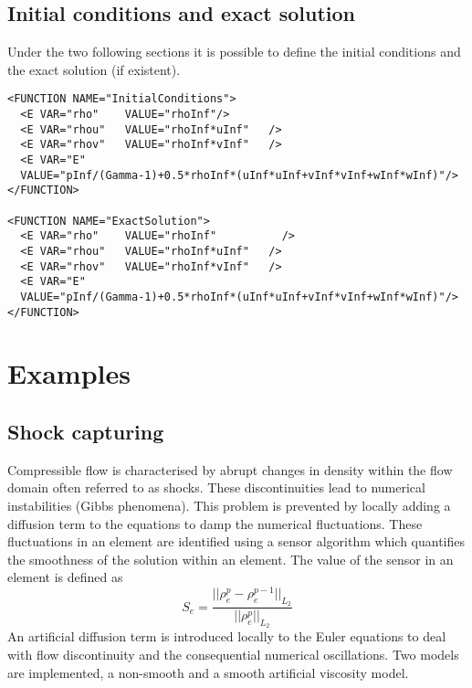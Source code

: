 \subsection*{Initial conditions and exact solution}
Under the two following sections it is possible to define the initial conditions and the exact solution (if existent).
\begin{lstlisting}[style=XmlStyle]
<FUNCTION NAME="InitialConditions">
  <E VAR="rho"    VALUE="rhoInf"/>
  <E VAR="rhou"   VALUE="rhoInf*uInf"   />
  <E VAR="rhov"   VALUE="rhoInf*vInf"   />
  <E VAR="E"
  VALUE="pInf/(Gamma-1)+0.5*rhoInf*(uInf*uInf+vInf*vInf+wInf*wInf)"/>
</FUNCTION>

<FUNCTION NAME="ExactSolution">
  <E VAR="rho"    VALUE="rhoInf"          />
  <E VAR="rhou"   VALUE="rhoInf*uInf"   />
  <E VAR="rhov"   VALUE="rhoInf*vInf"   />
  <E VAR="E"
  VALUE="pInf/(Gamma-1)+0.5*rhoInf*(uInf*uInf+vInf*vInf+wInf*wInf)"/>
</FUNCTION>
\end{lstlisting}

\section{Examples}
\subsection{Shock capturing}
Compressible flow is characterised by abrupt changes in density within the flow domain often referred to as shocks. These discontinuities lead to numerical instabilities (Gibbs phenomena). This problem is prevented by locally adding a diffusion term to the equations to damp the numerical fluctuations. These fluctuations in an element are identified using a sensor algorithm which quantifies the smoothness of the solution within an element. The value of the sensor in an element is defined as
\begin{equation}\label{eq:sensor}
S_e=\frac{||\rho^p_e-\rho^{p-1}_e||_{L_2}}{||\rho_e^p||_{L_2}}
\end{equation}
An artificial diffusion term is introduced locally to the Euler equations to deal with flow discontinuity and the consequential numerical oscillations. Two models are implemented, a non-smooth and a smooth artificial viscosity model.
